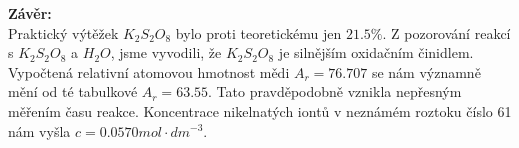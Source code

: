 \documentclass[13pt, a4paper, twoside]{article}
\begin{document}
\textbf{Závěr:}\\
Praktický výtěžek $K_2S_2O_8$ bylo proti teoretickému jen $21.5\%$.
Z pozorování reakcí s $K_2S_2O_8$ a $H_2O$, jsme vyvodili, že $K_2S_2O_8$ 
je silnějším oxidačním činidlem. Vypočtená relativní atomovou hmotnost mědi
$A_r=76.707$ se nám významně mění od té tabulkové $A_r=63.55$. Tato pravděpodobně vznikla nepřesným měřením času reakce.
Koncentrace nikelnatých iontů v neznámém roztoku číslo 61 nám vyšla $c=0.0570 mol\cdot dm^{-3}$.
\end{document}

